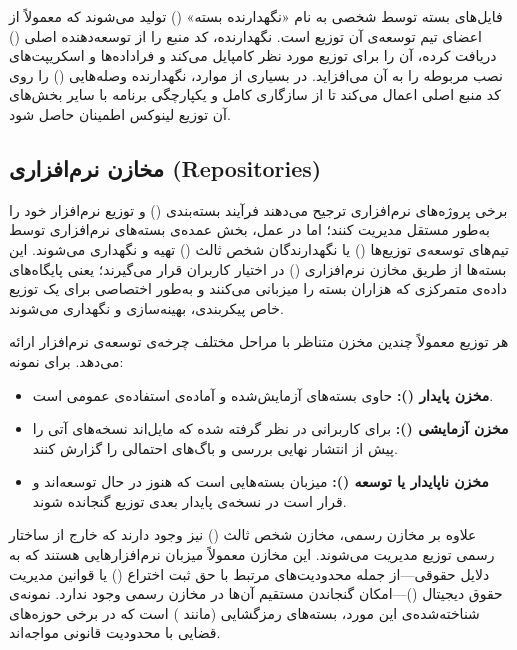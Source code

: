 فایل‌های بسته توسط شخصی به نام «نگهدارنده بسته» () تولید می‌شوند که معمولاً از اعضای تیم توسعه‌ی آن توزیع است. نگهدارنده، کد منبع را از توسعه‌دهنده اصلی () دریافت کرده، آن را برای توزیع مورد نظر کامپایل می‌کند و فراداده‌ها و اسکریپت‌های نصب مربوطه را به آن می‌افزاید. در بسیاری از موارد، نگهدارنده وصله‌هایی () را روی کد منبع اصلی اعمال می‌کند تا از سازگاری کامل و یکپارچگی برنامه با سایر بخش‌های آن توزیع لینوکس اطمینان حاصل شود.

\subsection{مخازن نرم‌افزاری (Repositories)}

برخی پروژه‌های نرم‌افزاری ترجیح می‌دهند فرآیند بسته‌بندی () و توزیع نرم‌افزار خود را به‌طور مستقل مدیریت کنند؛ اما در عمل، بخش عمده‌ی بسته‌های نرم‌افزاری توسط تیم‌های توسعه‌ی توزیع‌ها () یا نگهدارندگان شخص ثالث () تهیه و نگهداری می‌شوند. این بسته‌ها از طریق مخازن نرم‌افزاری () در اختیار کاربران قرار می‌گیرند؛ یعنی پایگاه‌های داده‌ی متمرکزی که هزاران بسته را میزبانی می‌کنند و به‌طور اختصاصی برای یک توزیع خاص پیکربندی، بهینه‌سازی و نگهداری می‌شوند.

هر توزیع معمولاً چندین مخزن متناظر با مراحل مختلف چرخه‌ی توسعه‌ی نرم‌افزار ارائه می‌دهد. برای نمونه:

\begin{itemize}
  \item \textbf{مخزن پایدار ():} حاوی بسته‌های آزمایش‌شده و آماده‌ی استفاده‌ی عمومی است.
  \item \textbf{مخزن آزمایشی ():} برای کاربرانی در نظر گرفته شده که مایل‌اند نسخه‌های آتی را پیش از انتشار نهایی بررسی و باگ‌های احتمالی را گزارش کنند.
  \item \textbf{مخزن ناپایدار یا توسعه ():} میزبان بسته‌هایی است که هنوز در حال توسعه‌اند و قرار است در نسخه‌ی پایدار بعدی توزیع گنجانده شوند.
\end{itemize}

علاوه بر مخازن رسمی، مخازن شخص ثالث () نیز وجود دارند که خارج از ساختار رسمی توزیع مدیریت می‌شوند. این مخازن معمولاً میزبان نرم‌افزارهایی هستند که به دلایل حقوقی—از جمله محدودیت‌های مرتبط با حق ثبت اختراع () یا قوانین مدیریت حقوق دیجیتال ()—امکان گنجاندن مستقیم آن‌ها در مخازن رسمی وجود ندارد. نمونه‌ی شناخته‌شده‌ی این مورد، بسته‌های رمزگشایی  (مانند ) است که در برخی حوزه‌های قضایی با محدودیت قانونی مواجه‌اند.

